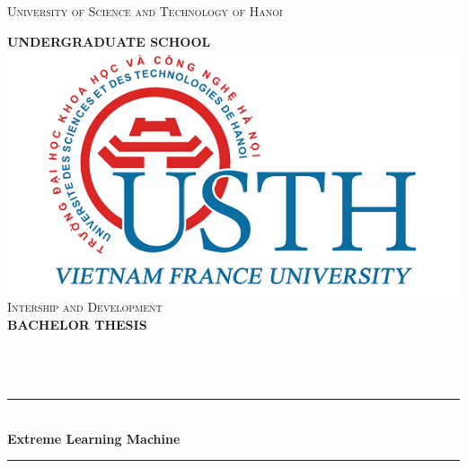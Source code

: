 \documentclass[13pt]{article}
\begin{document}
\begin{titlepage}
\centering
\textsc{\large University of Science and Technology of Hanoi} %

\textsc{\large \textbf{UNDERGRADUATE SCHOOL}}\\[1.0cm] %

\includegraphics[scale = 0.5]{usthlogo}\\[0.5 cm]	%

\textsc{\large Intership and Development}\\[0.5cm] %
\textsc{\huge \textbf{BACHELOR THESIS}}\\[0.5cm] 

\\[0.25cm] %
\\[0.25cm] %
\\[0.5cm] %

\rule{\linewidth}{0.2 mm} \\[0.4 cm]
{ \huge \bfseries Extreme Learning Machine}\\[0.4cm] %
\rule{\linewidth}{0.2 mm} \\[0.5 cm]

\\[0.25cm] %
\\
\\[0.25cm] %

\end{titlepage}
    
\newpage
\tableofcontents
{}
\newpage
\end{document}

